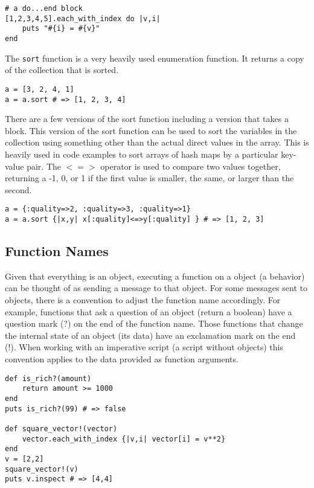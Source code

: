 \begin{bibunit}
\begin{lstlisting}
# a do...end block
[1,2,3,4,5].each_with_index do |v,i|
	puts "#{i} = #{v}"
end
\end{lstlisting}

The \texttt{sort} function is a very heavily used enumeration function. It returns a copy of the collection that is sorted. 

\begin{lstlisting}
a = [3, 2, 4, 1]
a = a.sort # => [1, 2, 3, 4]
\end{lstlisting}

There are a few versions of the sort function including a version that takes a block. This version of the sort function can be used to sort the variables in the collection using something other than the actual direct values in the array. This is heavily used in code examples to sort arrays of hash maps by a particular key-value pair. The \texttt{$<=>$} operator is used to compare two values together, returning a -1, 0, or 1 if the first value is smaller, the same, or larger than the second. 

\begin{lstlisting}
a = {:quality=>2, :quality=>3, :quality=>1}
a = a.sort {|x,y| x[:quality]<=>y[:quality] } # => [1, 2, 3]
\end{lstlisting}

\subsection{Function Names}
Given that everything is an object, executing a function on a object (a behavior) can be thought of as sending a message to that object. For some messages sent to objects, there is a convention to adjust the function name accordingly. For example, functions that ask a question of an object (return a boolean) have a question mark (?) on the end of the function name. Those functions that change the internal state of an object (its data) have an exclamation mark on the end (!). When working with an imperative script (a script without objects) this convention applies to the data provided as function arguments.

\begin{lstlisting}
def is_rich?(amount)
	return amount >= 1000
end
puts is_rich?(99) # => false

def square_vector!(vector)
	vector.each_with_index {|v,i| vector[i] = v**2}
end
v = [2,2]
square_vector!(v) 
puts v.inspect # => [4,4]
\end{lstlisting}


\end{bibunit}
